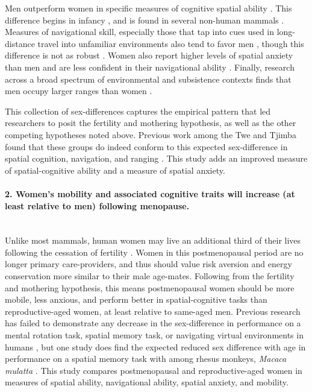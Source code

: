 Men outperform women in specific measures of cognitive spatial ability \citep{sanders1982sex, shepard1971mental, eals1994hunter, lawton2010gender}.  This difference begins in infancy \citep{quinn2008sex, moore2008mental, levine1999early}, and is found in several non-human mammals \citep{javsarevic2012spatial, perdue2011sex, gaulin1986sex}.  Measures of navigational skill, especially those that tap into cues used in long-distance travel into unfamiliar environments also tend to favor men \citep{moffat1998navigation, bryant1982personality, galea1993sex, henrie1997gender}, though this difference is not as robust \citep{burke2012women, gilmartin1984comparing, montello1999comparison}.  Women also report higher levels of spatial anxiety than men and are less confident in their navigational ability \citep{devlin1995interactive, lawton1994gender, picucci2011besides}.  Finally, research across a broad spectrum of environmental and subsistence contexts finds that men occupy larger ranges than women \citep{ecuyer2004have, gaulin1988evolution, macdonald1999reproductive}.

This collection of sex-differences captures the empirical pattern that led researchers to posit the fertility and mothering hypothesis, as well as the other competing hypotheses noted above.  Previous work among the Twe and Tjimba found that these groups do indeed conform to this expected sex-difference in spatial cognition, navigation, and ranging \citep{vashro2014spatial}.  This study adds an improved measure of spatial-cognitive ability and a measure of spatial anxiety.

\paragraph{2.  Women's mobility and associated cognitive traits will increase (at least relative to men) following menopause.}\mbox{}\\

Unlike most mammals, human women may live an additional third of their lives following the cessation of fertility \citep{hawkes2003grandmothers}.  Women in this postmenopausal period are no longer primary care-providers, and thus should value risk aversion and energy conservation more similar to their male age-mates.  Following from the fertility and mothering hypothesis, this means postmenopausal women should be more mobile, less anxious, and perform better in spatial-cognitive tasks than reproductive-aged women, at least relative to same-aged men.  Previous research has failed to demonstrate any decrease in the sex-difference in performance on a mental rotation task, spatial memory task, or navigating virtual environments in humans \citep{willis1988gender, driscoll2005virtual, moffat2001age}, but one study does find the expected reduced sex difference with age in performance on a spatial memory task with among rhesus monkeys, \emph{Macaca mulatta} \cite{lacreuse1999spatial}.  This study compares postmenopausal and reproductive-aged women in measures of spatial ability, navigational ability, spatial anxiety, and mobility.    

